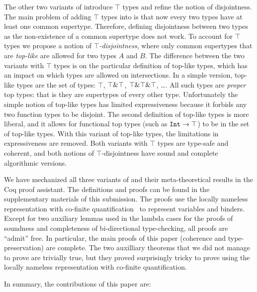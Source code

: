 The other two variants of \name introduce $\top$ types and refine the
notion of disjointness. The main problem of adding $\top$ types into
\name is that now every two types have at least one common supertype.
Therefore, defining disjointness between two types as the
non-existence of a common supertype does not work.  To account for
$\top$ types we propose a notion of \emph{$\top$-disjointness}, where
only common supertypes that are \emph{top-like} are allowed for two
types $A$ and $B$. The difference between the two variants with $\top$
types is on the particular definition of top-like types,
which has an impact on which types are allowed on intersections.
In a simple version, top-like types are the set of types: $\top$, 
$\top\&\top$, $\top\&\top\&\top$, \ldots. All such types
are \emph{proper} top types: that is they are supertypes of every
other type. Unfortunately the simple notion of top-like types 
has limited expressiveness because it forbids any two function types 
to be disjoint. The second definition of top-like types 
is more liberal, and it allows for functional top types (such as 
$\texttt{Int}\to\texttt{$\top$}$) to be in the set of top-like types. With 
this variant of top-like types, the limitations in expressiveness are
removed. Both variants with $\top$ types are type-safe and coherent, 
and both notions of $\top$-disjointness have sound and complete
algorithmic versions.

We have mechanized all three variants of \name and their
meta-theoretical results in the Coq proof assistant. The definitions
and proofs can be found in the supplementary materials of this
submission. The proofs use the locally nameless representation with
co-finite quantification~\cite{aydemir-popl-08} to represent variables and
binders. Except for two auxiliary lemmas used in the lambda cases for
the proofs of soundness and completeness of bi-directional
type-checking, all proofs are ``admit'' free. In particular,
the main proofs of this paper (coherence and type-preservation) are
complete.  The two auxilliary theorems that we did not manage to prove
are trivially true, but they proved surprisingly tricky to prove using
the locally nameless representation with co-finite quantification.

In summary, the contributions of this paper are:

